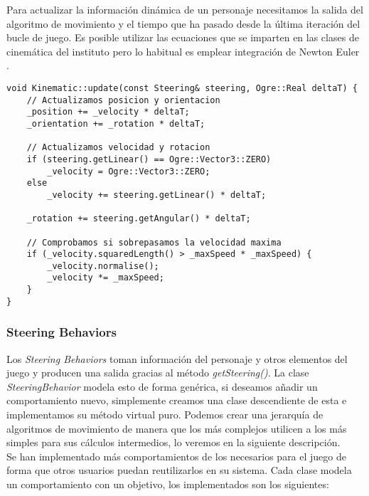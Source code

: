 

Para actualizar la información dinámica de un personaje necesitamos la salida
del algoritmo de movimiento y el tiempo que ha pasado desde la última iteración
del bucle de juego. Es posible utilizar las ecuaciones que se imparten en
las clases de cinemática del instituto pero lo habitual es emplear
integración de Newton Euler \cite{mill09}.

\begin{lstlisting}[style=C++]
void Kinematic::update(const Steering& steering, Ogre::Real deltaT) {
    // Actualizamos posicion y orientacion
    _position += _velocity * deltaT;
    _orientation += _rotation * deltaT;
    
    // Actualizamos velocidad y rotacion
    if (steering.getLinear() == Ogre::Vector3::ZERO)
        _velocity = Ogre::Vector3::ZERO;
    else
        _velocity += steering.getLinear() * deltaT;
        
    _rotation += steering.getAngular() * deltaT;
        
    // Comprobamos si sobrepasamos la velocidad maxima
    if (_velocity.squaredLength() > _maxSpeed * _maxSpeed) {
        _velocity.normalise();
        _velocity *= _maxSpeed;
    }
}
\end{lstlisting}


\subsubsection{Steering Behaviors}

Los \textit{Steering Behaviors} toman información del personaje y otros
elementos del juego y producen una salida gracias al método \textit{getSteering()}.
La clase \textit{SteeringBehavior} modela esto de forma genérica, si deseamos
añadir un comportamiento nuevo, simplemente creamos una clase descendiente
de esta e implementamos su método virtual puro. Podemos crear una jerarquía
de algoritmos de movimiento de manera que los más complejos utilicen a los 
más simples para sus cálculos intermedios, lo veremos en la siguiente
descripción.\\

Se han implementado más comportamientos de los necesarios para el juego
de forma que otros usuarios puedan reutilizarlos en su sistema.
Cada clase modela un comportamiento con un objetivo, los implementados son
los siguientes:\\

